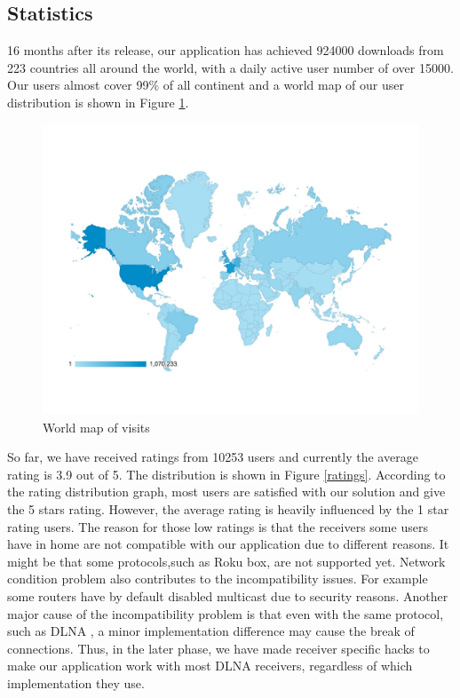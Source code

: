 \subsection{Statistics}
16 months after its release, our application has achieved 924000 downloads from 223 countries all around the world, with a daily active user number of over 15000. Our users almost cover 99\% of all continent and a world map of our user distribution is shown in Figure \ref{user_map}. 
\begin{figure}[hb]
\centering \includegraphics[width=0.9\columnwidth]{charts/session_world_map}
\caption{World map of visits \label{user_map}}
\end{figure}
So far, we have received ratings from 10253 users and currently the average rating is 3.9 out of 5. The distribution is shown in Figure \ref{ratings}. According to the rating distribution graph, most users are satisfied with our solution and give the 5 stars rating. However, the average rating is heavily influenced by the 1 star rating users. The reason for those low ratings is that the receivers some users have in home are not compatible with our application due to different reasons. It might be that some protocols,such as Roku box, are not supported yet. Network condition problem also contributes to the incompatibility issues. For example some routers have by default disabled multicast due to security reasons. Another major cause of the incompatibility problem is that even with the same protocol, such as DLNA , a minor implementation difference may cause the break of connections. Thus, in the later phase, we have made receiver specific hacks to make our application work with most DLNA receivers, regardless of which implementation they use.
